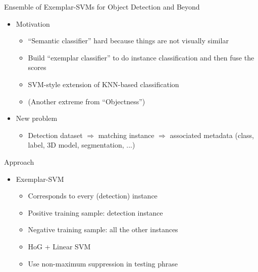 \documentclass[12pt]{beamer}
\begin{document}
\begin{frame}{Ensemble of Exemplar-SVMs for Object Detection and Beyond}
	\begin{itemize}
		\item Motivation
		\begin{itemize}
			\item ``Semantic classifier'' hard because things are not visually similar
			\item Build ``exemplar classifier'' to do instance classification and then fuse the scores
			\item SVM-style extension of KNN-based classification
            \item (Another extreme from ``Objectness'')
		\end{itemize}
		\item New problem
		\begin{itemize}
			\item Detection dataset $\Rightarrow$ matching instance $\Rightarrow$ associated metadata (class, label, 3D model, segmentation, ...)
		\end{itemize}
	\end{itemize}
\end{frame}

\begin{frame}{Approach}
	\begin{itemize}
		\item Exemplar-SVM
		\begin{itemize}
			\item Corresponds to every (detection) instance
			\item Positive training sample: detection instance
			\item Negative training sample: all the other instances
			\item HoG + Linear SVM
			\item Use non-maximum suppression in testing phrase
		\end{itemize}
	\end{itemize}
\end{frame}
\end{document}
